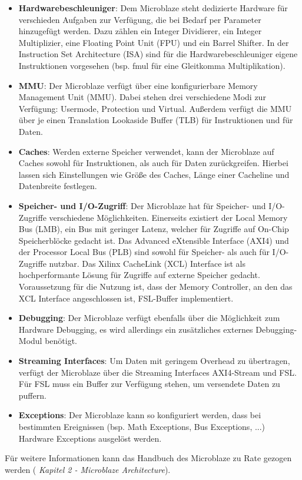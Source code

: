 \begin{itemize}
\item \textbf{Hardwarebeschleuniger}: Dem Microblaze steht dedizierte Hardware für verschieden Aufgaben zur Verfügung, die bei Bedarf per Parameter hinzugefügt werden. Dazu zählen ein Integer Dividierer, ein Integer Multiplizier, eine Floating Point Unit (FPU) und ein Barrel Shifter. In der Instruction Set Architecture (ISA) sind für die Hardwarebeschleuniger eigene Instruktionen vorgesehen (bsp. fmul für eine Gleitkomma Multiplikation).
\item \textbf{MMU}: Der Microblaze verfügt über eine konfigurierbare Memory Management Unit (MMU). Dabei stehen drei verschiedene Modi zur Verfügung: Usermode, Protection und Virtual. Außerdem verfügt die MMU über je einen Translation Lookaside Buffer (TLB) für Instruktionen und für Daten.
\item \textbf{Caches}: Werden externe Speicher verwendet, kann der Microblaze auf Caches sowohl für Instruktionen, als auch für Daten zurückgreifen. Hierbei lassen sich Einstellungen wie Größe des Caches, Länge einer Cacheline und Datenbreite festlegen.
\item \textbf{Speicher- und I/O-Zugriff}: Der Microblaze hat für Speicher- und I/O-Zugriffe verschiedene Möglichkeiten. Einerseits existiert der Local Memory Bus (LMB), ein Bus mit geringer Latenz, welcher für Zugriffe auf On-Chip Speicherblöcke gedacht ist. Das Advanced eXtensible Interface (AXI4) und der Processor Local Bus (PLB) sind sowohl für Speicher- als auch für I/O-Zugriffe nutzbar.
Das Xilinx CacheLink (XCL) Interface ist als hochperformante Lösung für Zugriffe auf externe Speicher gedacht. Voraussetzung für die Nutzung ist, dass der Memory Controller, an den das XCL Interface angeschlossen ist, FSL-Buffer implementiert.
\item \textbf{Debugging}: Der Microblaze verfügt ebenfalls über die Möglichkeit zum Hardware Debugging, es wird allerdings ein zusätzliches externes Debugging-Modul benötigt.
\item \textbf{Streaming Interfaces}: Um Daten mit geringem Overhead zu übertragen, verfügt der Microblaze über die Streaming Interfaces AXI4-Stream und FSL. Für FSL muss ein Buffer zur Verfügung stehen, um versendete Daten zu puffern.
\item \textbf{Exceptions}: Der Microblaze kann so konfiguriert werden, dass bei bestimmten Ereignissen (bsp. Math Exceptions, Bus Exceptions, ...) Hardware Exceptions ausgelöst werden.
\end{itemize}
Für weitere Informationen kann das Handbuch des Microblaze zu Rate gezogen werden (\cite{MBREF} \textit{Kapitel 2 - Microblaze Architecture}).
